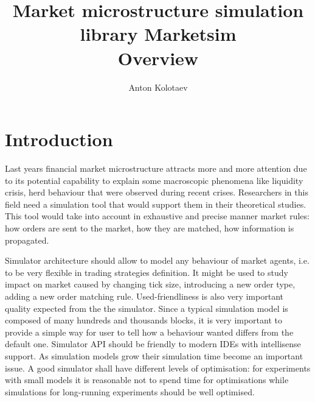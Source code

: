 \documentclass[a4paper,11pt]{article}
\title{Market microstructure simulation library Marketsim\\Overview}
\author{Anton Kolotaev}
\begin{document}
\maketitle

\tableofcontents



















\newpage

\section{Introduction}
Last years financial market microstructure attracts more and more
attention due to its potential capability to explain some macroscopic
phenomena like liquidity crisis, herd behaviour that were observed during
recent crises. Researchers in this field need a simulation tool that would
support them in their theoretical studies. This tool would take into
account in exhaustive and precise manner market rules: how orders are sent to the market,
how they are matched, how information is propagated.

Simulator architecture should allow to model any behaviour of market
agents, i.e. to be very flexible in trading strategies definition. It might be
used to study impact on market caused by changing tick size, introducing
a new order type, adding a new order matching rule.
Used-friendliness is also very important quality expected from the the simulator. 
Since a typical simulation model is composed of
many hundreds and thousands blocks, it is very important to provide
a simple way for user to tell how a behaviour wanted differs from the
default one. Simulator API should be friendly to modern IDEs with
intellisense support.
As simulation models grow their simulation time become an important issue. A good simulator shall 
have different levels of optimisation: for experiments with small models it is reasonable not to spend time for optimisations while simulations for long-running experiments should be well optimised.
\end{document}
